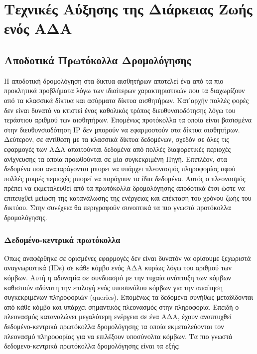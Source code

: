 
\chapter{Τεχνικές Αύξησης της Διάρκειας Ζωής ενός ΑΔΑ}\label{ch:energy_reduction}


\section{Αποδοτικά Πρωτόκολλα Δρομολόγησης}
Η αποδοτική δρομολόγηση στα δικτυα αισθητήρων αποτελεί ένα από τα πιο προκλητικά προβλήματα λόγω των ιδιαίτερων χαρακτηριστικών που τα διαχωρίζουν από τα κλασσικά
δίκτυα και ασύρματα δίκτυα αισθητήρων.
Κατ'αρχήν πολλές φορές δεν είναι δυνατό να κτιστεί ένας καθολικός τρόπος διευθυνσιοδότησης λόγω του τεράστιου αριθμού των αισθητήρων.
Επομένως προτόκολλα τα οποία είναι βασισμένα στην διευθυνσιοδότηση IP δεν μπορούν να εφαρμοστούν στα δίκτυα αισθητήρων.
Δεύτερον, σε αντίθεση με τα κλασσικά δίκτυα δεδομένων, σχεδόν σε όλες τις εφαρμογές των ΑΔΑ απαιτούνται δεδομένα από πολλές διαφορετικές περιοχές ανίχνευσης τα
οποία προωθούνται σε μία συγκεκριμένη Πηγή.
Επιπλέον, στα δεδομένα που αναπαράγονται μπορει να υπάρχει πλεονασμός πληροφορίας αφού πολλές μικρές περιοχές μπορεί να παράγουν τα ίδια δεδομένα.
Αυτός ο πλεονασμός πρέπει να εκμεταλευθεί από τα πρωτόκολλα δρομολόγησης αποδοτικά έτσι ώστε να επιτευχθεί μείωση της κατανάλωσης της ενέργειας και επέκταση του
χρόνου ζωής του δικτύου.
Στην συνέχεια θα περιγραφούν συνοπτικά τα πιο γνωστά προτόκολλα δρομολόγησης.


\subsection{Δεδομένο-κεντρικά πρωτόκολλα}
Όπως αναφέρθηκε σε ορισμένες εφαρμογές δεν είναι δυνατόν να ορίσουμε ξεχωριστά αναγνωριστικά (IDs) σε κάθε κόμβο ενός ΑΔΑ κυρίως λόγω του αριθμού των κόμβων.
Αυτή η αδυναμία σε συνδυασμό με την τυχαία ανάπτυξη των κόμβων καθιστούν αδύνατη την επιλογή ενός υποσυνόλου κόμβων για την απαίτηση
συγκεκριμένων πληροφοριών (queries).
Επομένως τα δεδομένα συνήθως μεταδίδονται από κάθε κόμβο και υπάρχει σημαντικός πλεονασμός στην πληροφορία.
Επειδή ο πλεονασμός καταναλώνει μεγαλύτερη ενέργεια σε ένα ΑΔΑ, έχουν αναπτυχθεί δεδομένο-κεντρικά πρωτόκολλα δρομολόγησης τα οποία εκμεταλεύονται τον πλεονασμό
πληροφορίας για να επιλέξουν υποσύνολτα κόμβων. Τα πιο γνωστά δεδομενο-κεντρικά πρωτόκολλα δρομολόγησης είναι τα εξής:

